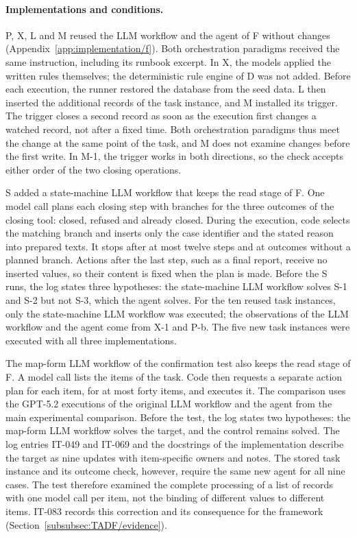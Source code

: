 \paragraph{Implementations and conditions.}
P, X, L and M reused the LLM workflow and the agent of F without changes (Appendix~\ref{app:implementation/f}). Both orchestration paradigms received the same instruction, including its runbook excerpt. In X, the models applied the written rules themselves; the deterministic rule engine of D was not added. Before each execution, the runner restored the database from the seed data. L then inserted the additional records of the task instance, and M installed its trigger. The trigger closes a second record as soon as the execution first changes a watched record, not after a fixed time. Both orchestration paradigms thus meet the change at the same point of the task, and M does not examine changes before the first write. In M-1, the trigger works in both directions, so the check accepts either order of the two closing operations.

S added a state-machine LLM workflow that keeps the read stage of F. One model call plans each closing step with branches for the three outcomes of the closing tool: closed, refused and already closed. During the execution, code selects the matching branch and inserts only the case identifier and the stated reason into prepared texts. It stops after at most twelve steps and at outcomes without a planned branch. Actions after the last step, such as a final report, receive no inserted values, so their content is fixed when the plan is made. Before the S runs, the log states three hypotheses: the state-machine LLM workflow solves S-1 and S-2 but not S-3, which the agent solves. For the ten reused task instances, only the state-machine LLM workflow was executed; the observations of the LLM workflow and the agent come from X-1 and P-b. The five new task instances were executed with all three implementations.

The map-form LLM workflow of the confirmation test also keeps the read stage of F. A model call lists the items of the task. Code then requests a separate action plan for each item, for at most forty items, and executes it. The comparison uses the GPT-5.2 executions of the original LLM workflow and the agent from the main experimental comparison. Before the test, the log states two hypotheses: the map-form LLM workflow solves the target, and the control remains solved. The log entries IT-049 and IT-069 and the docstrings of the implementation describe the target as nine updates with item-specific owners and notes. The stored task instance and its outcome check, however, require the same new agent for all nine cases. The test therefore examined the complete processing of a list of records with one model call per item, not the binding of different values to different items. IT-083 records this correction and its consequence for the framework (Section~\ref{subsubsec:TADF/evidence}).

